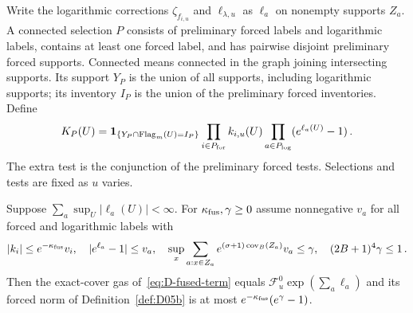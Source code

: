 Write the logarithmic corrections $\zeta_{f_{i,u}}$ and $\ell_{\lambda,u}$ as $\ell_a$ on nonempty supports $Z_a$. A connected selection $P$ consists of preliminary forced labels and logarithmic labels, contains at least one forced label, and has pairwise disjoint preliminary forced supports. Connected means connected in the graph joining intersecting supports. Its support $Y_P$ is the union of all supports, including logarithmic supports; its inventory $I_P$ is the union of the preliminary forced inventories. Define
\begin{equation}\label{eq:D-fused-term}
K_P(U)=\mathbf1_{\{Y_P\cap\operatorname{Flag}_m(U)=I_P\}}
\prod_{i\in P_{\rm for}}k_{i,u}(U)
\prod_{a\in P_{\rm log}}(e^{\ell_a(U)}-1)\,.
\end{equation}
The extra test is the conjunction of the preliminary forced tests. Selections and tests are fixed as $u$ varies.

\begin{lemma}\label{lem:D-fusion}
Suppose $\sum_a\sup_U|\ell_a(U)|<\infty$. For $\kappa_{\rm fus},\gamma\ge0$ assume nonnegative $v_a$ for all forced and logarithmic labels with
\begin{equation*}
|k_i|\le e^{-\kappa_{\rm fus}}v_i,\quad |e^{\ell_a}-1|\le v_a,\quad
\sup_x\sum_{a:x\in Z_a}e^{(\sigma+1)\operatorname{cov}_B(Z_a)}v_a\le\gamma,
\quad(2B+1)^4\gamma\le1\,.
\end{equation*}
Then the exact-cover gas of~\eqref{eq:D-fused-term} equals $\mathcal F_u^0\exp(\sum_a\ell_a)$ and its forced norm of Definition~\ref{def:D05b} is at most $e^{-\kappa_{\rm fus}}(e^\gamma-1)$.
\end{lemma}

